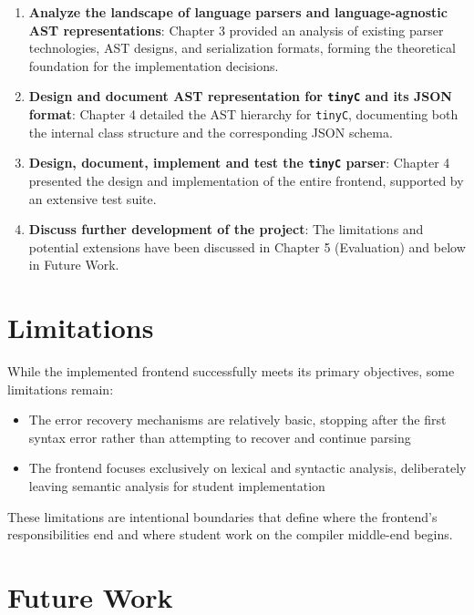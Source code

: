\begin{enumerate}
    \item \textbf{Analyze the landscape of language parsers and language-agnostic AST representations}: Chapter 3 provided an analysis of existing parser technologies, AST designs, and serialization formats, forming the theoretical foundation for the implementation decisions.
    
    \item \textbf{Design and document AST representation for \texttt{tinyC} and its JSON format}: Chapter 4 detailed the AST hierarchy for \texttt{tinyC}, documenting both the internal class structure and the corresponding JSON schema.
    
    \item \textbf{Design, document, implement and test the \texttt{tinyC} parser}: Chapter 4 presented the design and implementation of the entire frontend, supported by an extensive test suite.
    
    \item \textbf{Discuss further development of the project}: The limitations and potential extensions have been discussed in Chapter 5 (Evaluation) and below in Future Work.
\end{enumerate}

\section{Limitations}

While the implemented frontend successfully meets its primary objectives, some limitations remain:

\begin{itemize}
    \item The error recovery mechanisms are relatively basic, stopping after the first syntax error rather than attempting to recover and continue parsing
    \item The frontend focuses exclusively on lexical and syntactic analysis, deliberately leaving semantic analysis for student implementation
\end{itemize}

These limitations are intentional boundaries that define where the frontend's responsibilities end and where student work on the compiler middle-end begins.

\section{Future Work}

